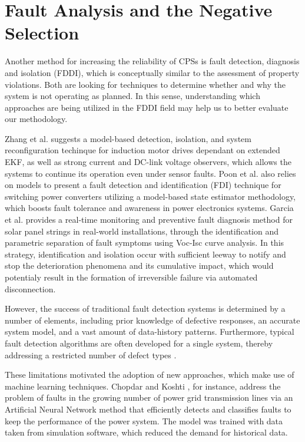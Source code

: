 \section{Fault Analysis and the Negative Selection}

Another method for increasing the reliability of CPSs is fault detection, diagnosis and isolation (FDDI), which is conceptually similar to the assessment of property violations. Both are looking for techniques to determine whether and why the system is not operating as planned. In this sense, understanding which approaches are being utilized in the FDDI field may help us to better evaluate our methodology.

Zhang et al. \cite{zhang2013sensor} suggests a model-based detection, isolation, and system reconfiguration techinque for induction motor drives dependant on extended EKF, as well as strong current and DC-link voltage observers, which allows the systems to continue its operation even under sensor faults. Poon et al. \cite{poon2016model} also relies on models to present a fault detection and identification (FDI) technique for switching power converters utilizing a model-based state estimator methodology, which boosts fault tolerance and awareness in power electronics systems. Garcia et al. \cite{garcia2022solar} provides a real-time monitoring and preventive fault diagnosis method for solar panel strings in real-world installations, through the identification and parametric separation of fault symptoms using Voc-Isc curve analysis. In this strategy, identification and isolation occur with sufficient leeway to notify and stop the deterioration phenomena and its cumulative impact, which would potentialy result in the formation of irreversible failure via automated disconnection.

However, the success of traditional fault detection systems is determined by a number of elements, including prior knowledge of defective responses, an accurate system model, and a vast amount of data-history patterns. Furthermore, typical fault detection algorithms are often developed for a single system, thereby addressing a restricted number of defect types \cite{abid2020improved}.

These limitations motivated the adoption of new approaches, which make use of machine learning techniques. Chopdar and Koshti \cite{9848016}, for instance, address the problem of faults in the growing number of power grid transmission lines via an Artificial Neural Network method that efficiently detects and classifies faults to keep the performance of the power system. The model was trained with data taken from simulation software, which reduced the demand for historical data.

